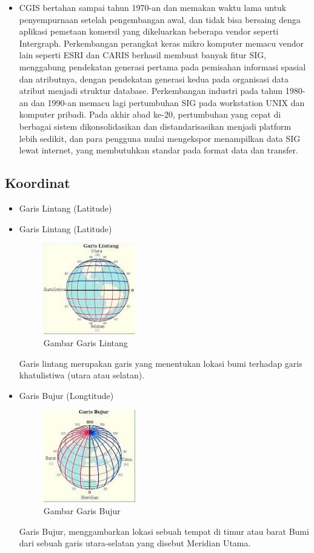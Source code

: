 \begin{itemize}
\item CGIS bertahan sampai tahun 1970-an dan memakan waktu lama untuk penyempurnaan setelah pengembangan awal, dan tidak bisa bersaing denga aplikasi pemetaan komersil yang dikeluarkan beberapa vendor seperti Intergraph. Perkembangan perangkat keras mikro komputer memacu vendor lain seperti ESRI dan CARIS berhasil membuat banyak fitur SIG, menggabung pendekatan generasi pertama pada pemisahan informasi spasial dan atributnya, dengan pendekatan generasi kedua pada organisasi data atribut menjadi struktur database. Perkembangan industri pada tahun 1980-an dan 1990-an memacu lagi pertumbuhan SIG pada workstation UNIX dan komputer pribadi. Pada akhir abad ke-20, pertumbuhan yang cepat di berbagai sistem dikonsolidasikan dan distandarisasikan menjadi platform lebih sedikit, dan para pengguna mulai mengekspor menampilkan data SIG lewat internet, yang membutuhkan standar pada format data dan transfer. 

\end{itemize}

\subsection{Koordinat}
\begin{itemize}
\item Garis Lintang (Latitude)
\item Garis Lintang (Latitude)
\begin{figure}[H]
	\includegraphics[width=4cm]{figures/Tugas1/1174069/lintang.jpg}
	\centering
	\caption{Gambar Garis Lintang}
\end{figure}
Garis lintang merupakan garis yang menentukan lokasi bumi terhadap garis khatulistiwa (utara atau selatan). 

\item Garis Bujur (Longtitude)
\begin{figure}[H]
	\includegraphics[width=4cm]{figures/Tugas1/1174069/bujur.jpg}
	\centering
	\caption{Gambar Garis Bujur}
\end{figure}
Garis Bujur, menggambarkan lokasi sebuah tempat di timur atau barat Bumi dari sebuah garis utara-selatan yang disebut Meridian Utama. 
\end{itemize}

